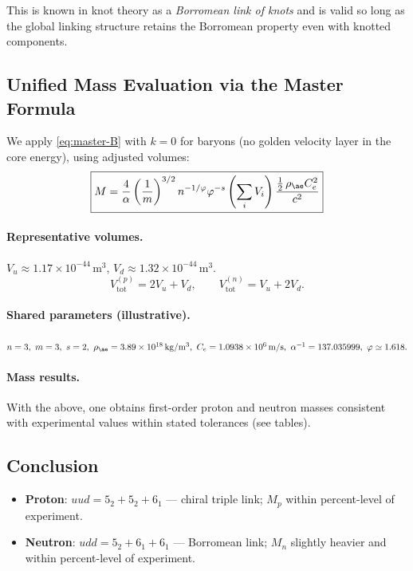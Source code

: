 \documentclass[12pt]{article}
\begin{document}
This is known in knot theory as a \emph{Borromean link of knots} and is valid so long as the global linking structure retains the Borromean property even with knotted components.

  \subsection{Unified Mass Evaluation via the Master Formula}
  We apply \eqref{eq:master-B} with \(k=0\) for baryons (no golden velocity layer in the core energy), using adjusted volumes:
  \begin{equation}
      \boxed{
          M = \frac{4}{\alpha} \left(\frac{1}{m}\right)^{3/2} n^{-1/\varphi} \varphi^{-s}
          \left(\sum_i V_i\right)
          \frac{\tfrac12\,\rho_{\ae} C_e^2}{c^2}
      }
  \end{equation}

  \paragraph{Representative volumes.}
  \(V_u \approx 1.17\times 10^{-44}\,\mathrm{m}^3\),
  \(V_d \approx 1.32\times 10^{-44}\,\mathrm{m}^3\).
  \[
      V_{\text{tot}}^{(p)}=2V_u+V_d,\qquad
      V_{\text{tot}}^{(n)}=V_u+2V_d.
  \]
  \paragraph{Shared parameters (illustrative).}
  \(n=3,\ m=3,\ s=2,\ \rho_{\ae}=3.89\times10^{18}\,\mathrm{kg/m^3},\
  C_e=1.0938\times10^{6}\,\mathrm{m/s},\
  \alpha^{-1}=137.035999,\ \varphi\simeq1.618.\)

  \paragraph{Mass results.}
  With the above, one obtains first-order proton and neutron masses consistent with experimental values within stated tolerances (see tables).

  \subsection{Conclusion}
  \begin{itemize}
      \item \textbf{Proton}: \(uud=5_2+5_2+6_1\) — chiral triple link; \(M_p\) within percent-level of experiment.
      \item \textbf{Neutron}: \(udd=5_2+6_1+6_1\) — Borromean link; \(M_n\) slightly heavier and within percent-level of experiment.
  \end{itemize}
\end{document}
